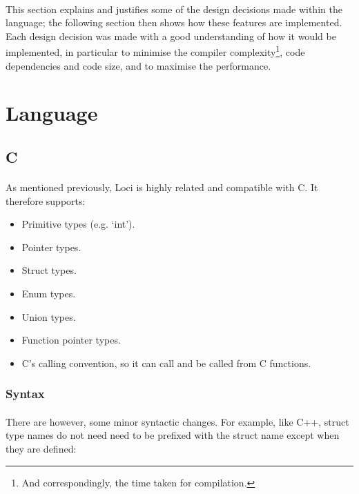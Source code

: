\documentclass[12pt,twoside,notitlepage]{report}
\begin{document}
\paragraph{}
This section explains and justifies some of the design decisions made within the language; the following section then shows how these features are implemented. Each design decision was made with a good understanding of how it would be implemented, in particular to minimise the compiler complexity\footnote{And correspondingly, the time taken for compilation.}, code dependencies and code size, and to maximise the performance.

\section{Language}

\subsection{C}

\paragraph{}
As mentioned previously, Loci is highly related and compatible with C. It therefore supports:

\begin{itemize}
\item Primitive types (e.g. `int').
\item Pointer types.
\item Struct types.
\item Enum types.
\item Union types.
\item Function pointer types.
\item C's calling convention, so it can call and be called from C functions.
\end{itemize}

\subsubsection{Syntax}

\paragraph{}
There are however, some minor syntactic changes. For example, like C++, struct type names do not need need to be prefixed with the struct name except when they are defined:
\end{document}
